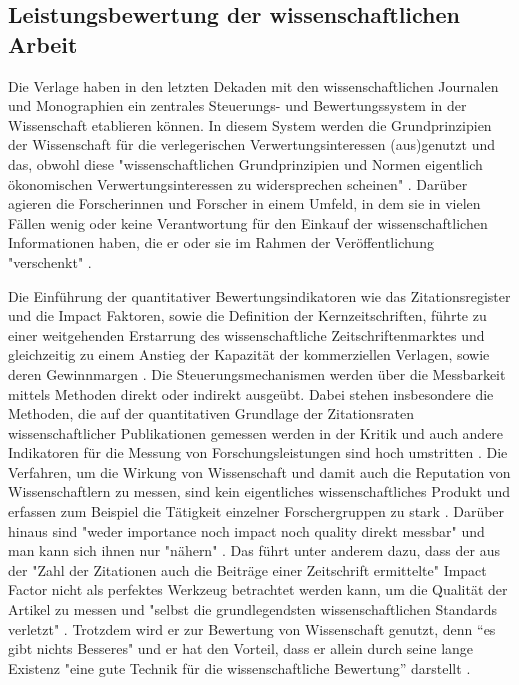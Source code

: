 \subsection{Leistungsbewertung der wissenschaftlichen Arbeit}

Die Verlage haben in den letzten Dekaden mit den wissenschaftlichen Journalen und Monographien ein zentrales Steuerungs- und Bewertungssystem in der Wissenschaft etablieren können. In diesem System werden die Grundprinzipien der Wissenschaft für die verlegerischen Verwertungsinteressen (aus)genutzt und das, obwohl diese "wissenschaftlichen Grundprinzipien und Normen eigentlich ökonomischen Verwertungsinteressen zu widersprechen scheinen" \cite{hanekop_2006}. Darüber agieren die Forscherinnen und Forscher in einem Umfeld, in dem sie in vielen Fällen wenig oder keine Verantwortung für den Einkauf der wissenschaftlichen Informationen haben, die er oder sie im Rahmen der Veröffentlichung "verschenkt" \cite{steele_2006}.

Die Einführung der quantitativer Bewertungsindikatoren wie das Zitationsregister und die Impact Faktoren, sowie die Definition der Kernzeitschriften, führte zu einer weitgehenden Erstarrung des wissenschaftliche Zeitschriftenmarktes und gleichzeitig zu einem Anstieg der Kapazität der kommerziellen Verlagen, sowie deren Gewinnmargen \cite{CREATe_2014}. Die Steuerungsmechanismen werden über die Messbarkeit mittels Methoden direkt oder indirekt ausgeübt. Dabei stehen insbesondere die Methoden, die auf der quantitativen Grundlage der Zitationsraten wissenschaftlicher Publikationen gemessen werden in der Kritik \cite{Brembs_2013} \cite{Dong_2005} und auch andere Indikatoren für die Messung von Forschungsleistungen sind hoch umstritten \cite{Hornbostel_1997} \cite{Hicks_1996} \cite{Havemann_2002} \cite{Warnke_2012}. Die Verfahren, um die Wirkung von Wissenschaft und damit auch die Reputation von Wissenschaftlern zu messen, sind kein eigentliches wissenschaftliches Produkt \cite{suchen} und erfassen zum Beispiel die Tätigkeit einzelner Forschergruppen zu stark \cite{schmoch_2009}. Darüber hinaus sind "weder importance noch impact noch quality direkt messbar" und man kann sich ihnen nur "nähern" \cite{Hornbostel_1997}. Das führt unter anderem dazu, dass der aus der "Zahl der Zitationen auch die Beiträge einer Zeitschrift ermittelte" \cite{weishaupt_2009_goldenOA} Impact Factor nicht als perfektes Werkzeug betrachtet werden kann, um die Qualität der Artikel zu messen \cite{garfield_1999} und "selbst die grundlegendsten wissenschaftlichen Standards verletzt" \cite{Brembs_20013}. Trotzdem wird er zur Bewertung von Wissenschaft genutzt, denn “es gibt nichts Besseres" und er hat den Vorteil, dass er allein durch seine lange Existenz "eine gute Technik für die wissenschaftliche Bewertung” darstellt \cite{garfield_1999} \cite{weishaupt_2009_goldenOA}.

